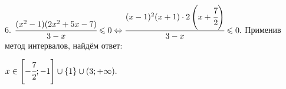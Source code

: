 6. $\cfrac{(x^2-1)(2x^2+5x-7)}{3-x}\leqslant0\Leftrightarrow\cfrac{(x-1)^2(x+1)\cdot 2\left(x+\cfrac{7}{2}\right)}{3-x}\leqslant0.$ Применив метод интервалов, найдём ответ:
\begin{figure}[ht!]
\end{figure}
$x\in\left[-\cfrac{7}{2};-1\right]\cup\{1\}\cup(3;+\infty).$\\
